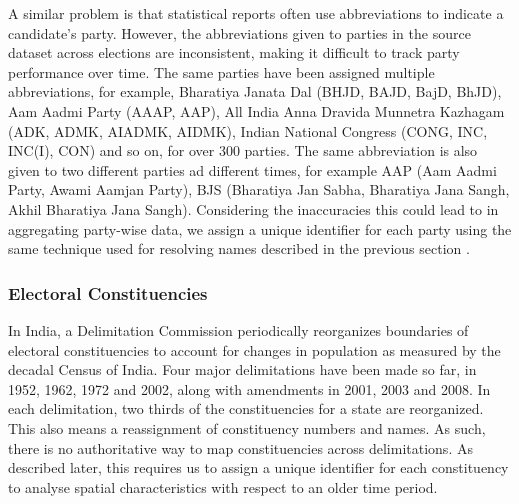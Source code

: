 A similar problem is that statistical reports often use abbreviations to indicate a candidate's party. However, the abbreviations given to parties in the source dataset across elections are inconsistent, making it difficult to track party performance over time. The same parties have been assigned multiple abbreviations, for example, Bharatiya Janata Dal (BHJD, BAJD, BajD, BhJD), Aam Aadmi Party (AAAP, AAP), All India Anna Dravida Munnetra Kazhagam (ADK, ADMK, AIADMK, AIDMK), Indian National Congress (CONG, INC, INC(I), CON) and so on, for over 300 parties. The same abbreviation is also given to two different parties ad different times, for example AAP (Aam Aadmi Party, Awami Aamjan Party), BJS (Bharatiya Jan Sabha, Bharatiya Jana Sangh, Akhil Bharatiya Jana Sangh). Considering the inaccuracies this could lead to in aggregating party-wise data, we assign a unique identifier for each party using the same technique used for resolving names described in the previous section \cite{nissa2019party, nissa2019factions}.

\subsubsection{Electoral Constituencies}
\label{sec:delim}

In India, a Delimitation Commission periodically reorganizes boundaries of electoral constituencies to account for changes in population as measured by the decadal Census of India. Four major delimitations have been made so far, in 1952, 1962, 1972 and 2002, along with amendments in 2001, 2003 and 2008. In each delimitation, two thirds of the constituencies for a state are reorganized. This also means a reassignment of constituency numbers and names. As such, there is no authoritative way to map constituencies across delimitations. As described later, this requires us to assign a unique identifier for each constituency to analyse spatial characteristics with respect to an older time period.



